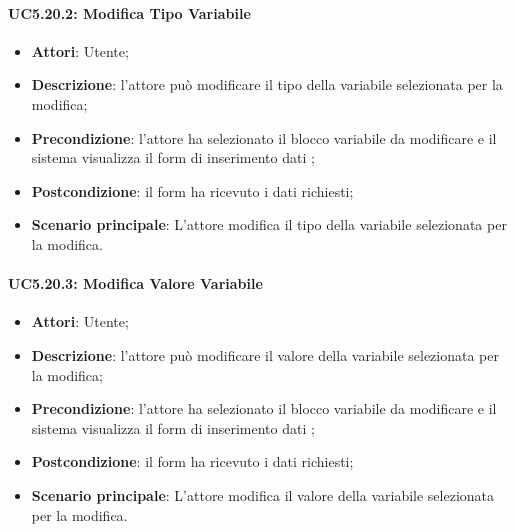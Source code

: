\begin{itemize}
\begin{itemize}
\begin{itemize}
\begin{itemize}
\paragraph{UC5.20.2: Modifica Tipo Variabile}
\label{UC5.20.2}
\begin{itemize}
	\item \textbf{Attori}: Utente;
	\item \textbf{Descrizione}: l'attore può modificare il tipo della variabile selezionata per la modifica;
	\item \textbf{Precondizione}: l'attore ha selezionato il blocco variabile da modificare e il sistema visualizza il form di inserimento dati ;
	\item \textbf{Postcondizione}: il form ha ricevuto i dati richiesti;
	\item \textbf{Scenario principale}: L'attore modifica il tipo della variabile selezionata per la modifica.
	\end{itemize}
	\paragraph{UC5.20.3: Modifica Valore Variabile}
	\label{UC5.20.3}
	\begin{itemize}
		\item \textbf{Attori}: Utente;
		\item \textbf{Descrizione}: l'attore può modificare il valore della variabile selezionata per la modifica;
		\item \textbf{Precondizione}: l'attore ha selezionato il blocco variabile da modificare e il sistema visualizza il form di inserimento dati ;
		\item \textbf{Postcondizione}: il form ha ricevuto i dati richiesti;
		\item \textbf{Scenario principale}: L'attore modifica il valore della variabile selezionata per la modifica.
\end{itemize}


\end{itemize}
\end{itemize}
\end{itemize}
\end{itemize}
